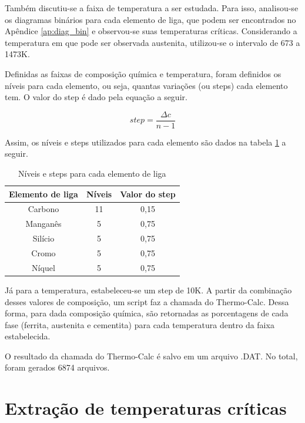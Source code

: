 \documentclass[brazil,tese,epusp]{usp}
\begin{document}
Também discutiu-se a faixa de temperatura a ser estudada. Para isso, analisou-se os diagramas binários para cada elemento de liga, que podem ser encontrados no Apêndice \ref{ap:diag_bin} e observou-se suas temperaturas críticas. Considerando a temperatura em que pode ser observada austenita, utilizou-se o intervalo de 673 a 1473K.

Definidas as faixas de composição química e temperatura, foram definidos os níveis para cada elemento, ou seja, quantas variações (ou steps) cada elemento tem. O valor do step é dado pela equação a seguir.

\begin{equation}
  step = \frac{\Delta c}{n - 1}
\end{equation}

Assim, os níveis e steps utilizados para cada elemento são dados na tabela \ref{tab:niveis_e_steps} a seguir.

\begin{table}
  \caption{Níveis e steps para cada elemento de liga}

  \begin{tabular}{c c c}
  \hline
  \textbf{Elemento de liga} & \textbf{Níveis} & \textbf{Valor do step} \\
  \hline
  Carbono & 11 & 0,15 \\
  Manganês & 5 & 0,75 \\
  Silício & 5 & 0,75 \\
  Cromo & 5 & 0,75 \\
  Níquel & 5 & 0,75 \\
  \hline
  \end{tabular}

  \label{tab:niveis_e_steps}
\end{table}


Já para a temperatura, estabeleceu-se um step de 10K. A partir da combinação desses valores de composição, um script faz a chamada do Thermo-Calc\textregistered{}. Dessa forma, para dada composição química, são retornadas as porcentagens de cada fase (ferrita, austenita e cementita) para cada temperatura dentro da faixa estabelecida.

O resultado da chamada do Thermo-Calc\textregistered{} é salvo em um arquivo .DAT. No total, foram gerados 6874 arquivos.

\section{Extra\c{c}\~ao de temperaturas cr\'iticas}
\end{document}
